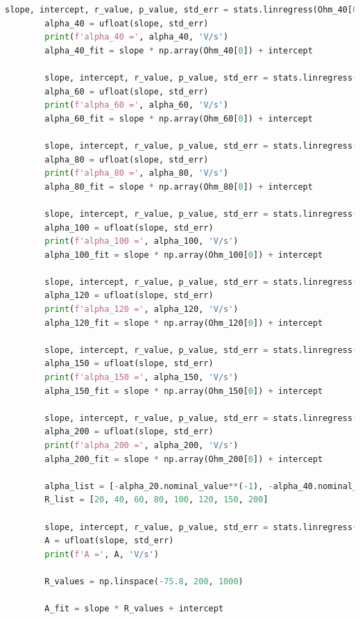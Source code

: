 \documentclass[a4paper,11pt]{article}
\begin{document}
\begin{lstlisting}[language=Python, basicstyle=\tiny, breaklines=true, postbreak=\mbox{\textbackslashspace}]
        slope, intercept, r_value, p_value, std_err = stats.linregress(Ohm_40[0], Ohm_40['U_ind'])
        alpha_40 = ufloat(slope, std_err)
        print(f'alpha_40 =', alpha_40, 'V/s')
        alpha_40_fit = slope * np.array(Ohm_40[0]) + intercept

        slope, intercept, r_value, p_value, std_err = stats.linregress(Ohm_60[0], Ohm_60['U_ind'])
        alpha_60 = ufloat(slope, std_err)
        print(f'alpha_60 =', alpha_60, 'V/s')
        alpha_60_fit = slope * np.array(Ohm_60[0]) + intercept

        slope, intercept, r_value, p_value, std_err = stats.linregress(Ohm_80[0], Ohm_80['U_ind'])
        alpha_80 = ufloat(slope, std_err)
        print(f'alpha_80 =', alpha_80, 'V/s')
        alpha_80_fit = slope * np.array(Ohm_80[0]) + intercept

        slope, intercept, r_value, p_value, std_err = stats.linregress(Ohm_100[0], Ohm_100['U_ind'])
        alpha_100 = ufloat(slope, std_err)
        print(f'alpha_100 =', alpha_100, 'V/s')
        alpha_100_fit = slope * np.array(Ohm_100[0]) + intercept

        slope, intercept, r_value, p_value, std_err = stats.linregress(Ohm_120[0], Ohm_120['U_ind'])
        alpha_120 = ufloat(slope, std_err)
        print(f'alpha_120 =', alpha_120, 'V/s')
        alpha_120_fit = slope * np.array(Ohm_120[0]) + intercept

        slope, intercept, r_value, p_value, std_err = stats.linregress(Ohm_150[0], Ohm_150['U_ind'])
        alpha_150 = ufloat(slope, std_err)
        print(f'alpha_150 =', alpha_150, 'V/s')
        alpha_150_fit = slope * np.array(Ohm_150[0]) + intercept

        slope, intercept, r_value, p_value, std_err = stats.linregress(Ohm_200[0], Ohm_200['U_ind'])
        alpha_200 = ufloat(slope, std_err)
        print(f'alpha_200 =', alpha_200, 'V/s')
        alpha_200_fit = slope * np.array(Ohm_200[0]) + intercept

        alpha_list = [-alpha_20.nominal_value**(-1), -alpha_40.nominal_value**(-1), -alpha_60.nominal_value**(-1), -alpha_80.nominal_value**(-1), -alpha_100.nominal_value**(-1), -alpha_120.nominal_value**(-1), -alpha_150.nominal_value**(-1), -alpha_200.nominal_value**(-1)]
        R_list = [20, 40, 60, 80, 100, 120, 150, 200]

        slope, intercept, r_value, p_value, std_err = stats.linregress(R_list, alpha_list)
        A = ufloat(slope, std_err)
        print(f'A =', A, 'V/s')

        R_values = np.linspace(-75.8, 200, 1000)

        A_fit = slope * R_values + intercept
    \end{lstlisting}
\end{document}

